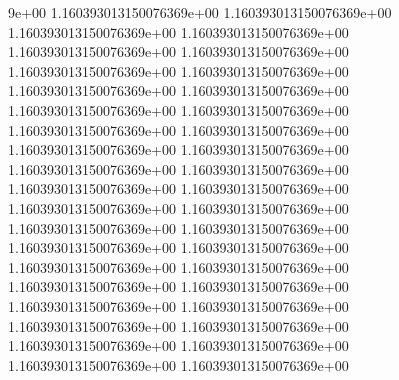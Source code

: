 9e+00	1.160393013150076369e+00	1.160393013150076369e+00	1.160393013150076369e+00	1.160393013150076369e+00	1.160393013150076369e+00	1.160393013150076369e+00	1.160393013150076369e+00	1.160393013150076369e+00	1.160393013150076369e+00	1.160393013150076369e+00	1.160393013150076369e+00	1.160393013150076369e+00	1.160393013150076369e+00	1.160393013150076369e+00	1.160393013150076369e+00	1.160393013150076369e+00	1.160393013150076369e+00	1.160393013150076369e+00	1.160393013150076369e+00	1.160393013150076369e+00	1.160393013150076369e+00	1.160393013150076369e+00	1.160393013150076369e+00	1.160393013150076369e+00	1.160393013150076369e+00	1.160393013150076369e+00	1.160393013150076369e+00	1.160393013150076369e+00	1.160393013150076369e+00	1.160393013150076369e+00	1.160393013150076369e+00	1.160393013150076369e+00	1.160393013150076369e+00	1.160393013150076369e+00	1.160393013150076369e+00	1.160393013150076369e+00	1.160393013150076369e+00	1.160393013150076369e+00
